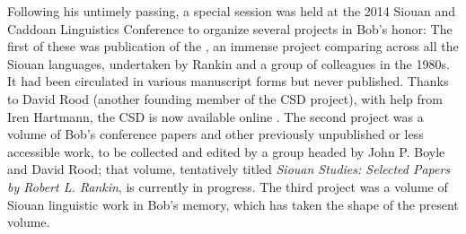 \begin{refsection}
Following his untimely passing, a special session was held at the 2014 Siouan and Caddoan Linguistics Conference to organize several projects in Bob's honor: The first of these was publication of the , an immense project comparing  across all the Siouan languages, undertaken by Rankin and a group of colleagues in the 1980s. It had been circulated in various manuscript forms but never published. Thanks to David Rood (another founding member of the CSD project), with help from Iren Hartmann, the CSD is now available online \citep{RankinEtAl2015AccessSeptember}. The second project was a volume of Bob's conference papers and other previously unpublished or less accessible work, to be collected and edited by a group headed by John P. Boyle and David Rood; that volume, tentatively titled \textit{Siouan Studies: Selected Papers by Robert L. Rankin}, is currently in progress. The third project was a volume of Siouan linguistic work in Bob's memory, which has taken the shape of the present volume.

\printbibliography[heading=subbibliography,notkeyword=this]

%

\end{refsection}

